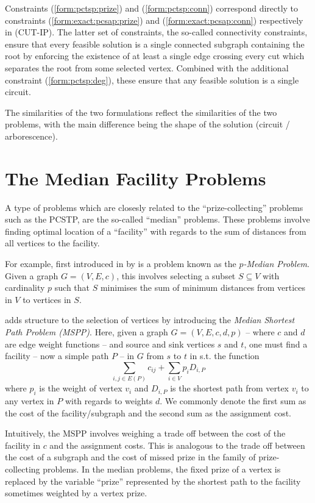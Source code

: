  Constraints (\ref{form:pctsp:prize}) and (\ref{form:pctsp:conn}) correspond directly to constraints
 (\ref{form:exact:pcsap:prize}) and (\ref{form:exact:pcsap:conn}) respectively in (CUT-IP).
 The latter set of constraints, the so-called connectivity constraints, ensure that every feasible solution
 is a single connected subgraph containing the root by enforcing the existence of at least a single edge crossing
 every cut which separates the root from some selected vertex. Combined with the
 additional constraint (\ref{form:pctsp:deg}), these ensure that any feasible solution is a single circuit.

 The similarities of the two formulations reflect the similarities of the two problems, with the main difference being
 the shape of the solution (circuit / arborescence).

 \section{The Median Facility Problems}
 A type of problems which are closesly related to the ``prize-collecting'' problems such as the PCSTP, are the so-called
 ``median'' problems. These problems involve finding optimal location of a ``facility'' with regards to the sum
 of distances from all vertices to the facility.

 For example, first introduced in \citeyear{hakimi1964optimum} by \citet{hakimi1964optimum} is a problem known as
 the \textit{$p$-Median Problem}. Given a graph $G = (V, E, c)$, this involves selecting a subset $S \subseteq V$ with
 cardinality $p$ such that $S$ minimises the sum of minimum distances from vertices in $V$ to vertices in $S$.
 
 \citet{current1987median} adds structure to the selection of vertices by introducing the \textit{Median Shortest Path Problem (MSPP)}.
 Here, given a graph $G = (V,E,c,d,p)$ -- where $c$ and $d$ are edge weight functions --
 and source and sink vertices $s$ and $t$, one must find a facility
  -- now a simple path $P$ --  in $G$
 from $s$ to $t$ in s.t. the function
 $$\sum_{i,j \in E(P)} c_{ij} + \sum_{i \in V} p_i D_{i, P}$$
 where $p_i$ is the weight of vertex $v_i$ and
 $D_{i, P}$ is the shortest path from vertex $v_i$ to any vertex in $P$ with regards to
 weights $d$.
 We commonly denote the first sum as the cost of the facility/subgraph and the second sum as the assignment cost.

 Intuitively, the MSPP involves weighing a trade off between the cost of the facility
 in $c$ and the assignment costs. 
 This is analogous to the trade off between the cost of a subgraph and the cost of missed prize in the
 family of prize-collecting problems. In the median problems, the fixed prize of a vertex is
 replaced by the variable ``prize'' represented by the shortest path to the facility sometimes weighted
 by a vertex prize.
